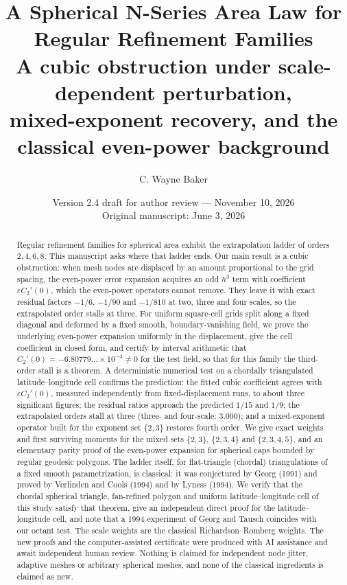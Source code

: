 \documentclass[11pt]{article}
\title{A Spherical N-Series Area Law for Regular Refinement Families\\[2pt]
\large A cubic obstruction under scale-dependent perturbation,\\
mixed-exponent recovery, and the classical even-power background}
\author{C. Wayne Baker}
\date{Version 2.4 draft for author review --- November 10, 2026\\ Original manuscript: June 3, 2026}
\theoremstyle{remark}
\begin{document}
\maketitle

\begin{abstract}
Regular refinement families for spherical area exhibit the extrapolation ladder of orders
$2,4,6,8$. This manuscript asks where that ladder ends. Our main result is a cubic
obstruction: when mesh nodes are displaced by an amount proportional to the grid spacing, the
even-power error expansion acquires an odd $h^3$ term with coefficient $\varepsilon C_2'(0)$,
which the even-power operators cannot remove. They leave it with exact residual factors
$-1/6$, $-1/90$ and $-1/810$ at two, three and four scales, so the extrapolated order stalls
at three. For uniform square-cell grids split along a fixed diagonal and deformed by a fixed
smooth, boundary-vanishing field, we prove the underlying even-power expansion uniformly in
the displacement, give the cell coefficient in closed form, and certify by interval
arithmetic that $C_2'(0)=-6.80779\ldots\times10^{-4}\neq0$ for the test field, so that for this
family the third-order stall is a theorem. A deterministic numerical test on a chordally triangulated latitude--longitude cell
confirms the prediction: the fitted cubic coefficient agrees with $\varepsilon C_2'(0)$,
measured independently from fixed-displacement runs, to about three significant figures; the
residual ratios approach the predicted $1/15$ and $1/9$; the extrapolated orders stall at
three (three- and four-scale: $3.000$); and a mixed-exponent operator built for the exponent set $\{2,3\}$ restores fourth
order. We give exact weights and first surviving moments for the mixed sets $\{2,3\}$,
$\{2,3,4\}$ and $\{2,3,4,5\}$, and an elementary parity proof of the even-power expansion for
spherical caps bounded by regular geodesic polygons. The ladder itself, for flat-triangle
(chordal) triangulations of a fixed smooth parametrization, is classical: it was conjectured
by Georg (1991) and proved by Verlinden and Cools (1994) and by Lyness (1994). We verify that
the chordal spherical triangle, fan-refined polygon and uniform latitude--longitude cell of
this study satisfy that theorem, give an independent direct proof for the latitude--longitude
cell, and note that a 1994 experiment of Georg and Tausch coincides with our octant test. The
scale weights are the classical Richardson--Romberg weights. The new proofs and the
computer-assisted certificate were produced with AI assistance and await independent human
review. Nothing is claimed for independent node jitter, adaptive meshes or arbitrary
spherical meshes, and none of the classical ingredients is claimed as new.
\end{abstract}
\end{document}
